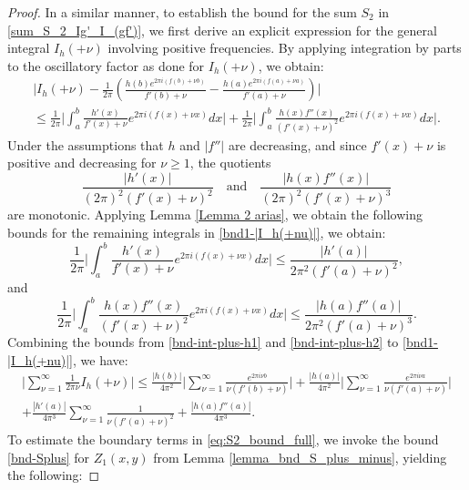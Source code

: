 \documentclass[11pt,letterpaper,oneside,reqno]{amsart}
\renewcommand{\^}[1]{\widehat{#1}}
\numberwithin{equation}{section}
\theoremstyle{remark}
\begin{document}
\begin{proof}
In a similar manner, to establish the bound for the sum $S_2$ in \eqref{sum_S_2_Ig'_I_(gf')}, we first derive an explicit expression for the general integral $I_h(+\nu)$ involving positive frequencies. By applying integration by parts to the oscillatory factor as done for $I_h
(+\nu)$, we obtain:
%
\begin{multline}
    \bigg| I_h(+\nu)-\frac{1}{2\pi}\left( \frac{h(b) e^{2 \pi i (f(b) + \nu b)}}{f'(b) + \nu} - \frac{h(a) e^{2 \pi i (f(a) +\nu a)}}{f'(a) + \nu}\right) \bigg|  
     \\ \leq \frac{1}{2\pi} \bigg|  \int_a^b \frac{h'(x)}{f'(x) + \nu} e^{2\pi i (f(x) + \nu x)} dx \bigg|   + \frac{1}{2\pi} \bigg|  \int_a^b \frac{h(x)f''(x)}{(f'(x) + \nu)^2} e^{2\pi i (f(x) + \nu x)} dx \bigg| . \label{bnd1-|I_h(+nu)|} 
\end{multline}
Under the assumptions that $h$ and $|f''|$ are decreasing, and since $f'(x) + \nu$ is positive and decreasing for $\nu  \geq 1$, the quotients 
$$\frac{|h'(x)|}{(2\pi)^2 (f'(x) + \nu)^2} \quad \text{and} \quad  \frac{|h(x)f''(x)|}{(2\pi)^2 (f'(x) + \nu)^3} $$
are monotonic. Applying Lemma \ref{Lemma 2 arias}, we obtain the following bounds for the remaining integrals in \eqref{bnd1-|I_h(+nu)|}, we obtain:
\begin{equation}
    \frac{1}{2\pi} \bigg|  \int_a^b \frac{h'(x)}{f'(x) + \nu} e^{2\pi i (f(x) + \nu x)} dx \bigg|  \leq \frac{|h'(a)|}{2\pi^2 (f'(a) + \nu)^2}, \label{bnd-int-plus-h1}
\end{equation}
and
\begin{equation}
    \frac{1}{2\pi} \bigg|  \int_a^b \frac{h(x)f''(x)}{(f'(x) + \nu)^2} e^{2\pi i (f(x) + \nu x)} dx \bigg|  \leq \frac{|h(a)f''(a)|}{2\pi^2 (f'(a) + \nu)^3}. \label{bnd-int-plus-h2}
\end{equation}
Combining the bounds from \eqref{bnd-int-plus-h1} and \eqref{bnd-int-plus-h2} to \eqref{bnd1-|I_h(+nu)|}, we have:
 \begin{multline}\label{eq:S2_bound_full}
\bigg| \sum_{\nu=1}^{\infty} \frac{1}{2 \pi \nu} I_h(+\nu)\bigg| 
\leq 
\frac{|h(b)|}{4\pi^2} \bigg|  \sum_{\nu=1}^\infty \frac{e^{2\pi i \nu b}}{\nu(f'(b)+\nu)} \bigg|  + \frac{|h(a)|}{4\pi^2} \bigg|  \sum_{\nu=1}^\infty \frac{e^{2\pi i \nu a}}{\nu(f'(a)+\nu)} \bigg| \\
+ \frac{|h'(a)|}{4 \pi^3} \sum_{\nu=1}^{\infty} \frac{1}{\nu (f'(a) + \nu)^2} + \frac{|h(a) f''(a)|}{4 \pi^3}.
    \end{multline}
To estimate the boundary terms in \eqref{eq:S2_bound_full}, we invoke the bound \eqref{bnd-Splus} for $Z_1(x, y)$ from Lemma \ref{lemma_bnd_S_plus_minus}, yielding the following:

\end{proof}
\end{document}

